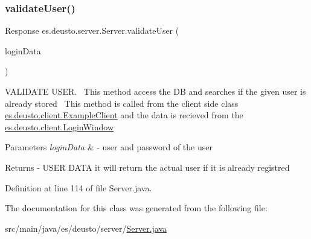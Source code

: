 \subsubsection{\texorpdfstring{validate\+User()}{validateUser()}}
{\footnotesize\ttfamily Response es.\+deusto.\+server.\+Server.\+validate\+User (\begin{DoxyParamCaption}\item[{\hyperlink{classes_1_1deusto_1_1serialization_1_1_login_data}{Login\+Data}}]{login\+Data }\end{DoxyParamCaption})}

V\+A\+L\+I\+D\+A\+TE U\+S\+ER.~\newline
This method access the DB and searches if the given user is already stored~\newline
This method is called from the client side class \hyperlink{classes_1_1deusto_1_1client_1_1_example_client}{es.\+deusto.\+client.\+Example\+Client} and the data is recieved from the \hyperlink{classes_1_1deusto_1_1client_1_1_login_window}{es.\+deusto.\+client.\+Login\+Window}~\newline
 
\begin{DoxyParams}{Parameters}
{\em login\+Data} & -\/ user and password of the user \\
\hline
\end{DoxyParams}
\begin{DoxyReturn}{Returns}
-\/ U\+S\+ER D\+A\+TA it will return the actual user if it is already registred 
\end{DoxyReturn}


Definition at line 114 of file Server.\+java.



The documentation for this class was generated from the following file\+:\begin{DoxyCompactItemize}
\item 
src/main/java/es/deusto/server/\hyperlink{_server_8java}{Server.\+java}\end{DoxyCompactItemize}
